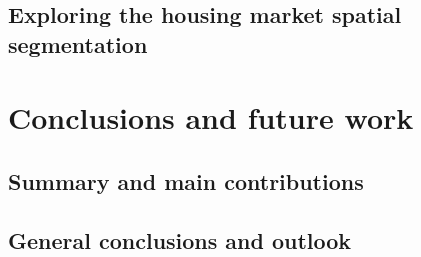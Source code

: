 \documentclass[
	11pt, %
	a4paper,
]{LegrandOrangeBook}
\begin{document}
\renewcommand{\thechapter}{8} %

\chapterspaceabove{6.75cm}
\chapterspacebelow{7.25cm}

\chapter{Exploring the housing market spatial segmentation \label{ch:Exploring the housing market spatial segmentation}}
%


\part{Conclusions and future work}

\renewcommand{\thechapter}{9} %
\chapterimage{}
\chapterspaceabove{6.75cm}
\chapterspacebelow{7.25cm}

\chapter{Summary and main contributions}


\renewcommand{\thechapter}{10} %
\chapterimage{}
\chapterspaceabove{6.75cm}
\chapterspacebelow{7.25cm}

\chapter{General conclusions and outlook}

\end{document}
